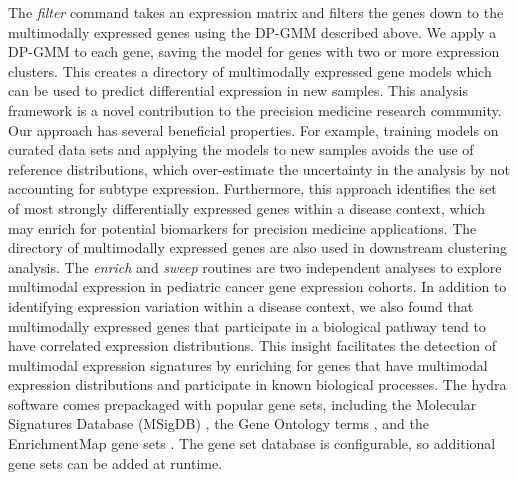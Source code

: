 \documentclass[10pt,letterpaper]{article}
\begin{document}
The \textit{filter} command takes an expression matrix and filters the genes down to the multimodally expressed genes using the DP-GMM described above. We apply a DP-GMM to each gene, saving the model for genes with two or more expression clusters. This creates a directory of multimodally expressed gene models which can be used to predict differential expression in new samples. This analysis framework is a novel contribution to the precision medicine research community. Our approach has several beneficial properties. For example, training models on curated data sets and applying the models to new samples avoids the use of reference distributions, which over-estimate the uncertainty in the analysis by not accounting for subtype expression. Furthermore, this approach identifies the set of most strongly differentially expressed genes within a disease context, which may enrich for potential biomarkers for precision medicine applications. The directory of multimodally expressed genes are also used in downstream clustering analysis. The \textit{enrich} and \textit{sweep} routines are two independent analyses to explore multimodal expression in pediatric cancer gene expression cohorts. In addition to identifying expression variation within a disease context, we also found that multimodally expressed genes that participate in a biological pathway tend to have correlated expression distributions. This insight facilitates the detection of multimodal expression signatures by enriching for genes that have multimodal expression distributions and participate in known biological processes. The hydra software comes prepackaged with popular gene sets, including the Molecular Signatures Database (MSigDB) \cite{liberzonMolecularSignaturesDatabase2011}, the Gene Ontology terms \cite{Ashburner2000, gene2018gene}, and the EnrichmentMap gene sets \cite{merico2010enrichment}. The gene set database is configurable, so additional gene sets can be added at runtime.
\end{document}
